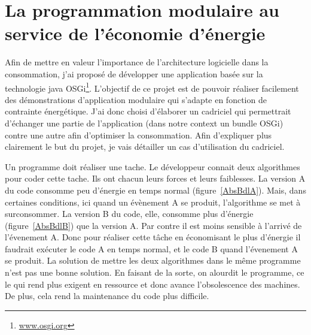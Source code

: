 \documentclass[a4paper, 11pt]{report}
\begin{document}
\chapter{La programmation modulaire au service de l'économie d'énergie}
Afin de mettre en valeur l'importance de l'architecture logicielle dans la consommation, j'ai proposé de développer une application basée sur la technologie java OSGi\footnote{\href{http://www.osgi.org}{www.osgi.org}}. L'objectif de ce projet est de pouvoir réaliser facilement des démonstrations d'application modulaire qui s'adapte en fonction de contrainte énergétique. J'ai donc choisi d'élaborer un cadriciel qui permettrait d'échanger une partie de l'application (dans notre context un \og bundle \fg OSGi) contre une autre afin d'optimiser la consommation. Afin d'expliquer plus clairement le but du projet, je vais détailler un cas d'utilisation du cadriciel.

Un programme doit réaliser une tache. Le développeur connait deux algorithmes pour coder cette tache. Ils ont chacun leurs forces et leurs faiblesses. La version A du code consomme peu d'énergie en temps normal (figure~\ref{AbsBdlA}). Mais, dans certaines conditions, ici quand un évènement A se produit, l'algorithme se met à surconsommer. La version B du code, elle, consomme plus d'énergie (figure~\ref{AbsBdlB}) que la version A. Par contre il est moins sensible à l'arrivé de l'évenement A. Donc pour réaliser cette tâche en économisant le plus d'énergie il faudrait exécuter le code A en temps normal, et le code B quand l'évenement A se produit. La solution de mettre les deux algorithmes dans le même programme n'est pas une bonne solution. En faisant de la sorte, on alourdit le programme, ce le qui rend plus exigent en ressource et donc avance l'obsolescence des machines. De plus, cela rend la maintenance du code plus difficile.
\end{document}
